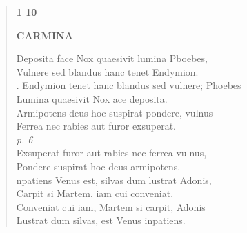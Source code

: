 \documentclass[11pt, a4paper]{report}
\begin{document}
\begin{verse}
    \begin{center} \textbf{1 10} \end{center}\begin{center} \textbf{CARMINA} \end{center}Deposita face Nox quaesivit lumina Pboebes, \\ Vulnere sed blandus hanc tenet Endymion. \\ . Endymion tenet hanc blandus sed vulnere; Phoebes \\ Lumina quaesivit Nox ace deposita. \\ Armipotens deus hoc suspirat pondere, vulnus \\ Ferrea nec rabies aut furor exsuperat. \\ \textit{p. 6} \\ Exsuperat furor aut rabies nec ferrea vulnus, \\ Pondere suspirat hoc deus armipotens. \\ npatiens Venus est, silvas dum lustrat Adonis, \\ Carpit si Martem, iam cui conveniat. \\ Conveniat cui iam, Martem si carpit, Adonis \\ Lustrat dum silvas, est Venus inpatiens. \\ 
      \end{verse}
  
\end{document}
